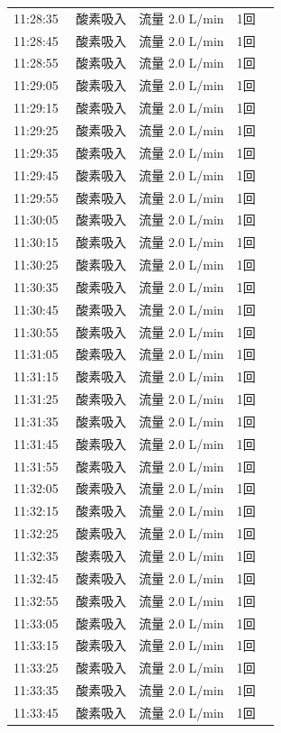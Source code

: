 \documentclass[UTF8,10pt,a4paper,fontset=fandol]{ctexart}
\begin{document}
\begin{minipage}[t]{0.48\linewidth}
\begin{tabular}{@{}p{0.22\linewidth}p{0.72\linewidth}@{}}
11:28:35 & 酸素吸入　流量 2.0 L/min　1回\\
11:28:45 & 酸素吸入　流量 2.0 L/min　1回\\
11:28:55 & 酸素吸入　流量 2.0 L/min　1回\\
11:29:05 & 酸素吸入　流量 2.0 L/min　1回\\
11:29:15 & 酸素吸入　流量 2.0 L/min　1回\\
11:29:25 & 酸素吸入　流量 2.0 L/min　1回\\
11:29:35 & 酸素吸入　流量 2.0 L/min　1回\\
11:29:45 & 酸素吸入　流量 2.0 L/min　1回\\
11:29:55 & 酸素吸入　流量 2.0 L/min　1回\\
11:30:05 & 酸素吸入　流量 2.0 L/min　1回\\
11:30:15 & 酸素吸入　流量 2.0 L/min　1回\\
11:30:25 & 酸素吸入　流量 2.0 L/min　1回\\
11:30:35 & 酸素吸入　流量 2.0 L/min　1回\\
11:30:45 & 酸素吸入　流量 2.0 L/min　1回\\
11:30:55 & 酸素吸入　流量 2.0 L/min　1回\\
11:31:05 & 酸素吸入　流量 2.0 L/min　1回\\
11:31:15 & 酸素吸入　流量 2.0 L/min　1回\\
11:31:25 & 酸素吸入　流量 2.0 L/min　1回\\
11:31:35 & 酸素吸入　流量 2.0 L/min　1回\\
11:31:45 & 酸素吸入　流量 2.0 L/min　1回\\
11:31:55 & 酸素吸入　流量 2.0 L/min　1回\\
11:32:05 & 酸素吸入　流量 2.0 L/min　1回\\
11:32:15 & 酸素吸入　流量 2.0 L/min　1回\\
11:32:25 & 酸素吸入　流量 2.0 L/min　1回\\
11:32:35 & 酸素吸入　流量 2.0 L/min　1回\\
11:32:45 & 酸素吸入　流量 2.0 L/min　1回\\
11:32:55 & 酸素吸入　流量 2.0 L/min　1回\\
11:33:05 & 酸素吸入　流量 2.0 L/min　1回\\
11:33:15 & 酸素吸入　流量 2.0 L/min　1回\\
11:33:25 & 酸素吸入　流量 2.0 L/min　1回\\
11:33:35 & 酸素吸入　流量 2.0 L/min　1回\\
11:33:45 & 酸素吸入　流量 2.0 L/min　1回\\

\end{tabular}
\end{minipage}
\end{document}
